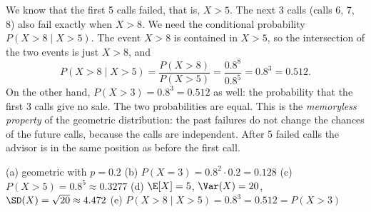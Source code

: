 \begin{solution}
	 We know that the first 5 calls failed, that is, $X>5$. The next
	3 calls (calls 6, 7, 8) also fail exactly when $X>8$. We need the
	conditional probability $P(X>8\mid X>5)$. The event $X>8$ is contained in
	$X>5$, so the intersection of the two events is just $X>8$, and
	\[ P(X>8\mid X>5)=\frac{P(X>8)}{P(X>5)}=\frac{0.8^8}{0.8^5}=0.8^3=0.512. \]
	On the other hand, $P(X>3)=0.8^3=0.512$ as well: the probability that the
	first 3 calls give no sale. The two probabilities are equal.
	This is the \emph{memoryless property} of the geometric distribution: the
	past failures do not change the chances of the future calls, because the
	calls are independent. After 5 failed calls the advisor is in the same
	position as before the first call.
	\begin{answer}
		(a) geometric with $p=0.2$ \quad
		(b) $P(X=3)=0.8^2\cdot0.2=0.128$ \quad
		(c) $P(X>5)=0.8^5\approx0.3277$ \quad
		(d) $\E[X]=5$, $\Var(X)=20$, $\SD(X)=\sqrt{20}\approx4.472$ \quad
		(e) $P(X>8\mid X>5)=0.8^3=0.512=P(X>3)$
	\end{answer}
\end{solution}
